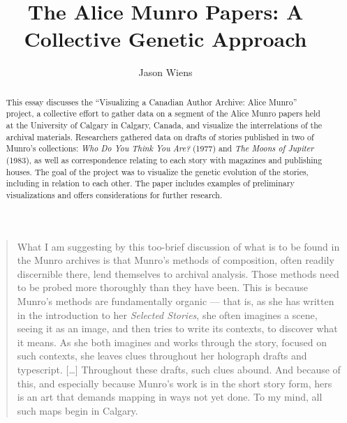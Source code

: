 \documentclass{article}
\author{Jason Wiens}
\title{The Alice Munro Papers: A Collective Genetic Approach}
\begin{document}
\renewcommand*{\pagemark}{}

\begin{abstract}
This essay discusses the ``Visualizing a Canadian Author Archive: Alice Munro'' project, a collective effort to gather data on a segment of the Alice Munro papers held at the University of Calgary in Calgary, Canada, and visualize the interrelations of the archival materials. Researchers gathered data on drafts of stories published in two of Munro’s collections: \emph{Who Do You Think You Are?} (1977) and \emph{The Moons of Jupiter} (1983), as well as correspondence relating to each story with magazines and publishing houses. The goal of the project was to visualize the genetic evolution of the stories, including in relation to each other. The paper includes examples of preliminary visualizations and offers considerations for further research.
\end{abstract}


\section*{} 
\begin{quote}
What I am suggesting by this too-brief discussion of what is to be found
in the Munro archives is that Munro's methods of composition, often readily
discernible there, lend themselves to archival analysis. Those methods
need to be probed more thoroughly than they have been. This is because
Munro's methods are fundamentally organic –– that is, as she has written
in the introduction to her \emph{Selected Stories}, she often imagines a
scene, seeing it as an image, and then tries to write its contexts, to
discover what it means. As she both imagines and works through the
story, focused on such contexts, she leaves clues throughout her
holograph drafts and typescript. {[}\ldots{]} Throughout these drafts,
such clues abound. And because of this, and especially because Munro's
work is in the short story form, hers is an art that demands mapping in
ways not yet done. To my mind, all such maps begin in Calgary.

\begin{flushright}
    \parencite[196]{thacker_reading_2016}
\end{flushright}
    
\end{quote}
\end{document}
